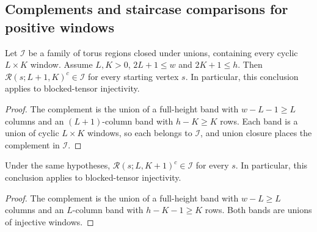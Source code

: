 \subsection{Complements and staircase comparisons for positive windows}
\label{subsec:peps_positive_window_comparison}

\begin{lemma}%
    \label{thm:peps_positive_window_complements}
    \leanok
    Let $\mathcal I$ be a family of torus regions closed under unions,
    containing every cyclic $L\times K$ window. Assume $L,K>0$,
    $2L+1\leq w$ and $2K+1\leq h$. Then
    $\mathcal R(s;L+1,K)^c\in\mathcal I$ for every starting vertex $s$.
    In particular, this conclusion applies to blocked-tensor injectivity.
\end{lemma}
\begin{proof}\leanok
    The complement is the union of a full-height band with
    $w-L-1\geq L$ columns and an $(L+1)$-column band with
    $h-K\geq K$ rows. Each band is a union of cyclic $L\times K$
    windows, so each belongs to $\mathcal I$, and union closure places the complement in $\mathcal I$.
\end{proof}

\begin{lemma}%
    \label{thm:peps_positive_vertical_window_complement}
    \leanok
    Under the same hypotheses,
    $\mathcal R(s;L,K+1)^c\in\mathcal I$ for every $s$.
    In particular, this conclusion applies to blocked-tensor injectivity.
\end{lemma}
\begin{proof}\leanok
    The complement is the union of a full-height band with
    $w-L\geq L$ columns and an $L$-column band with
    $h-K-1\geq K$ rows. Both bands are unions of injective windows.
\end{proof}

